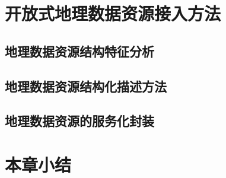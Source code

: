\section{开放式地理数据资源接入方法}
\subsection{地理数据资源结构特征分析}
\subsection{地理数据资源结构化描述方法}
\subsection{地理数据资源的服务化封装}


\section{本章小结}
